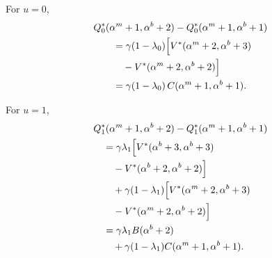 \documentclass[letterpaper,journal]{IEEEtran}
\begin{document}
For $u=0$,
\begin{align*}
&Q_0^*(\alpha^m+1,\alpha^b+2)-Q_0^*(\alpha^m+1,\alpha^b+1)\\
&\qquad=\gamma(1-\lambda_0)\Bigl[V^*(\alpha^m+2,\alpha^b+3)\\
&\qquad\quad -V^*(\alpha^m+2,\alpha^b+2)\Bigr]\\
&\qquad=\gamma(1-\lambda_0)\,C(\alpha^m+1,\alpha^b+1).
\end{align*}

For $u=1$,
\begin{align*}
&Q_1^*(\alpha^m+1,\alpha^b+2)-Q_1^*(\alpha^m+1,\alpha^b+1)\\
&\quad=\gamma\lambda_1\Bigl[V^*(\alpha^b+3,\alpha^b+3)\\
&\qquad -V^*(\alpha^b+2,\alpha^b+2)\Bigr]\\
&\qquad+\gamma(1-\lambda_1)\Bigl[V^*(\alpha^m+2,\alpha^b+3)\\
&\qquad -V^*(\alpha^m+2,\alpha^b+2)\Bigr]\\
&\quad =\gamma\lambda_1 B(\alpha^b+2)\\
&\qquad+\gamma(1-\lambda_1)C(\alpha^m+1,\alpha^b+1).
\end{align*}
\end{document}

